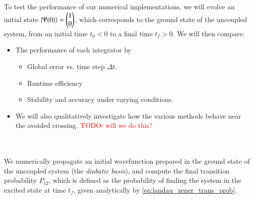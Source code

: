 \documentclass{subfiles}
\begin{document}
To test the performance of our numerical implementations, we will evolve an initial state $\ket{\Psi(0)} = \begin{pmatrix} 1 \\ 0 \end{pmatrix}$, which corresponds to the ground state of the uncoupled system, from an initial time $t_0<0$ to a final time $t_f>0$. We will then compare:
\begin{itemize}
    \item The performance of each integrator by
    \begin{itemize}
        \item Global error vs. time step $\Delta t$.
        \item Runtime efficiency
        \item Stability and accuracy under varying conditions. 
    \end{itemize}
    \item We will also qualitatively investigate how the various methods behave near the avoided crossing. \textcolor{red}{TODO: will we do this?}
\end{itemize}
\\ \\ We numerically propagate an initial wavefunction prepared in the ground state of the uncoupled system (the \emph{diabatic basis}), and compute the final transition probability $P_{12}$, which is defined as the probability of finding the system in the excited state at time $t_f$, given analytically by \eqref{eq:landau_zener_trans_prob}. \\
\end{document}
